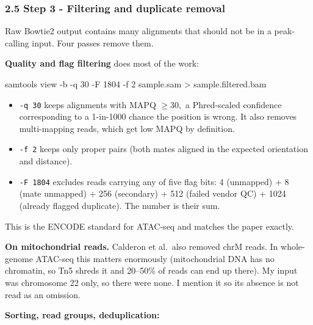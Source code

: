 \documentclass[
  11pt,
  a4paper,
]{article}
\newenvironment{Shaded}{}{}
\newcommand{\AttributeTok}[1]{\textcolor[rgb]{0.49,0.56,0.16}{#1}}
\newcommand{\ExtensionTok}[1]{#1}
\newcommand{\NormalTok}[1]{#1}
\newcommand{\OperatorTok}[1]{\textcolor[rgb]{0.40,0.40,0.40}{#1}}
\providecommand{\tightlist}{%
  \setlength{\itemsep}{0pt}\setlength{\parskip}{0pt}}
\begin{document}
\hypertarget{step-3---filtering-and-duplicate-removal}{%
\subsubsection{2.5 Step 3 - Filtering and duplicate
removal}\label{step-3---filtering-and-duplicate-removal}}

Raw Bowtie2 output contains many alignments that should not be in a
peak-calling input. Four passes remove them.

\textbf{Quality and flag filtering} does most of the work:

\begin{Shaded}
\begin{Highlighting}[]
\ExtensionTok{samtools}\NormalTok{ view }\AttributeTok{{-}b} \AttributeTok{{-}q}\NormalTok{ 30 }\AttributeTok{{-}F}\NormalTok{ 1804 }\AttributeTok{{-}f}\NormalTok{ 2 sample.sam }\OperatorTok{\textgreater{}}\NormalTok{ sample.filtered.bam}
\end{Highlighting}
\end{Shaded}

\begin{itemize}
\tightlist
\item
  \texttt{-q\ 30} keeps alignments with MAPQ \(\geq 30{,}\) a
  Phred-scaled confidence corresponding to a 1-in-1000 chance the
  position is wrong. It also removes multi-mapping reads, which get low
  MAPQ by definition.
\item
  \texttt{-f\ 2} keeps only proper pairs (both mates aligned in the
  expected orientation and distance).
\item
  \texttt{-F\ 1804} excludes reads carrying any of five flag bits: 4
  (unmapped) + 8 (mate unmapped) + 256 (secondary) + 512 (failed vendor
  QC) + 1024 (already flagged duplicate). The number is their sum.
\end{itemize}

This is the ENCODE standard for ATAC-seq and matches the paper exactly.

\textbf{On mitochondrial reads.} Calderon et al.~also removed chrM
reads. In whole-genome ATAC-seq this matters enormously (mitochondrial
DNA has no chromatin, so Tn5 shreds it and 20--50\% of reads can end up
there). My input was chromosome 22 only, so there were none. I mention
it so its absence is not read as an omission.

\textbf{Sorting, read groups, deduplication:}
\end{document}
